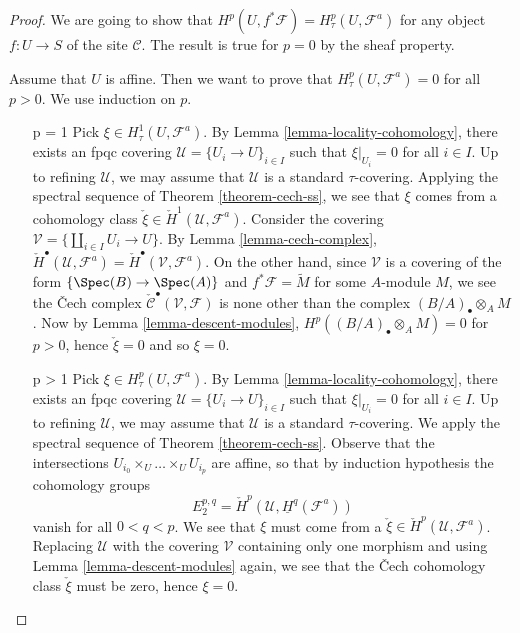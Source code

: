 \begin{proof}
We are going to show that
$H^p(U, f^*\mathcal{F}) = H^p_\tau(U, \mathcal{F}^a)$
for any object $f : U \to S$ of the site $\mathcal{C}$.
The result is true for $p = 0$ by the sheaf property.

\medskip\noindent
Assume that $U$ is affine. Then we want to prove that
$H^p_\tau(U, \mathcal{F}^a) = 0$ for all $p > 0$. We use induction on $p$.
\begin{enumerate}
\item[p = 1]
Pick $\xi \in H^1_\tau(U, \mathcal{F}^a)$.
By Lemma \ref{lemma-locality-cohomology},
there exists an fpqc covering $\mathcal{U} = \{U_i \to U\}_{i \in I}$
such that $\xi|_{U_i} = 0$ for all $i \in I$. Up to refining
$\mathcal{U}$, we may assume that $\mathcal{U}$ is a standard
$\tau$-covering. Applying the spectral sequence of
Theorem \ref{theorem-cech-ss},
we see that $\xi$ comes from a cohomology class
$\check \xi \in \check H^1(\mathcal{U}, \mathcal{F}^a)$.
Consider the covering $\mathcal{V} = \{\coprod_{i\in I} U_i \to U\}$. By
Lemma \ref{lemma-cech-complex},
$\check H^\bullet(\mathcal{U}, \mathcal{F}^a) =
\check H^\bullet(\mathcal{V}, \mathcal{F}^a)$.
On the other hand, since $\mathcal{V}$ is a covering of the form
$\{\Spec(B) \to \Spec(A)\}$ and $f^*\mathcal{F} = \widetilde{M}$
for some $A$-module $M$, we see the {\v C}ech complex
$\check{\mathcal{C}}^\bullet(\mathcal{V}, \mathcal{F})$
is none other than the complex $(B/A)_\bullet \otimes_A M$.
Now by Lemma \ref{lemma-descent-modules},
$H^p((B/A)_\bullet \otimes_A M) = 0$ for $p > 0$, hence $\check \xi = 0$
and so $\xi = 0$.
\item[p > 1]
Pick $\xi \in H^p_\tau(U, \mathcal{F}^a)$. By
Lemma \ref{lemma-locality-cohomology},
there exists an fpqc covering $\mathcal{U} = \{U_i \to U\}_{i \in I}$
such that $\xi|_{U_i} = 0$ for all $i \in I$. Up to refining
$\mathcal{U}$, we may assume that $\mathcal{U}$ is a standard
$\tau$-covering. We apply the spectral sequence of
Theorem \ref{theorem-cech-ss}.
Observe that the intersections $U_{i_0} \times_U \ldots \times_U U_{i_p}$
are affine, so that by induction hypothesis the cohomology groups
$$
E_2^{p, q} = \check H^p(\mathcal{U}, \underline{H}^q(\mathcal{F}^a))
$$
vanish for all $0 < q < p$. We see that $\xi$ must come from a
$\check \xi \in \check H^p(\mathcal{U}, \mathcal{F}^a)$. Replacing
$\mathcal{U}$ with the covering $\mathcal{V}$ containing only one morphism
and using Lemma \ref{lemma-descent-modules} again,
we see that the {\v C}ech cohomology class $\check \xi$ must be zero,
hence $\xi = 0$.

\end{enumerate}
\end{proof}
